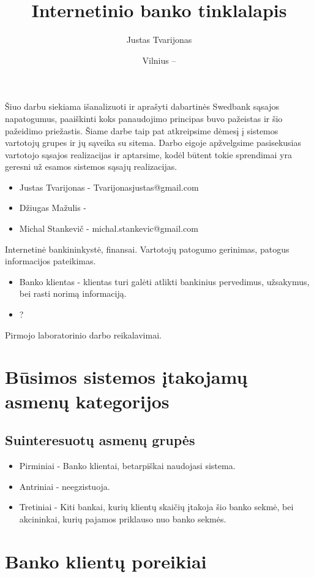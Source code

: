 \documentclass[oneside]{VUMIFPSkursinis}
\title{Internetinio banko tinklalapis}
\author{Justas Tvarijonas}
\date{Vilnius – \the\year}
\begin{document}
\maketitle

\tableofcontents
{}
Šiuo darbu siekiama išanalizuoti ir aprašyti dabartinės Swedbank sąsajos napatogumus, paaiškinti koks panaudojimo principas buvo pažeistas ir šio pažeidimo priežastis.
Šiame darbe taip pat atkreipsime dėmesį į sistemos vartotojų grupes ir jų sąveika su sitema.
Darbo eigoje apžvelgsime pasisekusias vartotojo sąsajos realizacijas ir aptarsime, kodėl būtent tokie sprendimai yra geresni už esamos sistemos sąsajų realizacijas.
\begin{itemize}
	\item Justas Tvarijonas - Tvarijonasjustas@gmail.com
	\item Džiugas Mažulis -
	\item Michal Stankevič - michal.stankevic@gmail.com
\end{itemize}
Internetinė bankininkystė, finansai.
Vartotojų patogumo gerinimas, patogus informacijos pateikimas.
\begin{itemize}
	\item Banko klientas - klientas turi galėti atlikti bankinius pervedimus, užsakymus, bei rasti norimą informaciją.
	\item ?
\end{itemize}
Pirmojo laboratorinio darbo reikalavimai.
\section{Būsimos sistemos įtakojamų asmenų kategorijos}
\subsection{Suinteresuotų asmenų grupės}
\begin{itemize}
	\item Pirminiai - Banko klientai, betarpiškai naudojasi sistema.
	\item Antriniai - neegzistuoja.
	\item Tretiniai - Kiti bankai, kurių klientų skaičių įtakoja šio banko sekmė, bei akcininkai, kurių pajamos priklauso nuo banko sekmės.
\end{itemize}
\section{Banko klientų poreikiai}
\end{document}
